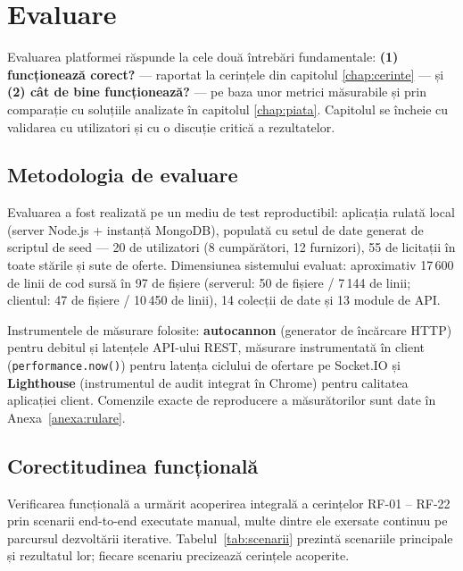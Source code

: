 \chapter{Evaluare}
\label{chap:evaluare}

Evaluarea platformei răspunde la cele două întrebări fundamentale: \textbf{(1) funcționează corect?} --- raportat la cerințele din capitolul \ref{chap:cerinte} --- și \textbf{(2) cât de bine funcționează?} --- pe baza unor metrici măsurabile și prin comparație cu soluțiile analizate în capitolul \ref{chap:piata}. Capitolul se încheie cu validarea cu utilizatori și cu o discuție critică a rezultatelor.

\section{Metodologia de evaluare}

Evaluarea a fost realizată pe un mediu de test reproductibil: aplicația rulată local (server Node.js + instanță MongoDB), populată cu setul de date generat de scriptul de seed --- 20 de utilizatori (8 cumpărători, 12 furnizori), 55 de licitații în toate stările și sute de oferte. Dimensiunea sistemului evaluat: aproximativ 17\,600 de linii de cod sursă în 97 de fișiere (serverul: 50 de fișiere / 7\,144 de linii; clientul: 47 de fișiere / 10\,450 de linii), 14 colecții de date și 13 module de API.


Instrumentele de măsurare folosite: \textbf{autocannon} (generator de încărcare HTTP) pentru debitul și latențele API-ului REST, măsurare instrumentată în client (\texttt{performance.now()}) pentru latența ciclului de ofertare pe Socket.IO și \textbf{Lighthouse} (instrumentul de audit integrat în Chrome) pentru calitatea aplicației client. Comenzile exacte de reproducere a măsurătorilor sunt date în Anexa~\ref{anexa:rulare}.

\section{Corectitudinea funcțională}

Verificarea funcțională a urmărit acoperirea integrală a cerințelor RF-01 -- RF-22 prin scenarii end-to-end executate manual, multe dintre ele exersate continuu pe parcursul dezvoltării iterative. Tabelul~\ref{tab:scenarii} prezintă scenariile principale și rezultatul lor; fiecare scenariu precizează cerințele acoperite.

